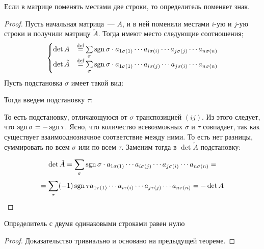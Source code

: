 \begin{theorem}
	\label{matrixdet:part:swaprows}
	Если в матрице поменять местами две строки, то определитель поменяет
	знак.
\end{theorem}
\begin{proof}
	Пусть начальная матрица~--- $A$, и в ней поменяли местами $i$-ую и
	$j$-ую строки и получили матрицу $\tilde A$. Тогда имеют место
	следующие соотношения;
	$$
	\begin{cases}
		\det A &\mathbin{\stackrel{\mathrm{def}}{=}}
			\sum\limits_\sigma\operatorname{sgn}\sigma\cdot
			a_{1\sigma(1)}
			\cdots
			a_{i\sigma(i)}
			\cdots
			a_{j\sigma(j)}
			\cdots
			a_{n\sigma(n)}
		\\
		\det\tilde A &\mathbin{\stackrel{\mathrm{def}}{=}}
			\sum\limits_\sigma\operatorname{sgn}\sigma\cdot
			a_{1\sigma(1)}
			\cdots
			a_{i\sigma(j)}
			\cdots
			a_{j\sigma(i)}
			\cdots
			a_{n\sigma(n)}
	\end{cases}
	$$
	Пусть подстановка $\sigma$ имеет такой вид:
\begin{center}
\end{center}
	Тогда введем подстановку $\tau$:
\begin{center}
\end{center}

	То есть подстановку, отличающуюся от $\sigma$ транспозицией $(ij)$.
	Из этого следует, что $\operatorname{sgn}\sigma=-\operatorname{sgn}\tau$. Ясно, что количество
	всевозможных $\sigma$ и $\tau$ совпадает, так как существует
	взаимооднозначное соответствие между ними. То есть нет разницы,
	суммировать по всем $\sigma$ или по всем $\tau$. Заменим тогда
	в $\det\tilde A$ подстановку:

	$$
	\det\tilde A =
	\sum_\sigma \operatorname{sgn}\sigma\cdot
		a_{1\sigma(1)}
		\cdots
		a_{i\sigma(j)}
		\cdots
		a_{j\sigma(i)}
		\cdots
		a_{n\sigma(n)}
	=
	$$ $$
	= \sum_\tau (-1)\operatorname{sgn}\tau
		a_{1\tau(1)}
		\cdots
		a_{i\tau(i)}
		\cdots
		a_{j\tau(j)}
		\cdots
		a_{n\tau(n)}
	= -\det A
	$$
\end{proof}

\begin{theorem}
  Определитель с двумя одинаковыми строками равен нулю
  \label{matrixdet:part:samerows}
\end{theorem}
\begin{proof}
  Доказательство тривиально и основано на предыдущей теореме.
\end{proof}

